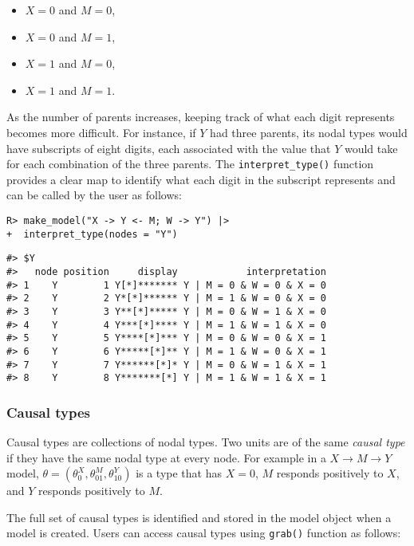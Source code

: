 \documentclass[
  11pt,
  article]{jss}
\providecommand{\tightlist}{%
  \setlength{\itemsep}{0pt}\setlength{\parskip}{0pt}}\usepackage{longtable,booktabs,array}
\begin{document}
\begin{itemize}
\tightlist
\item
  \(X = 0\) and \(M = 0\),
\item
  \(X = 0\) and \(M = 1\),
\item
  \(X = 1\) and \(M = 0\),
\item
  \(X = 1\) and \(M = 1\).
\end{itemize}

As the number of parents increases, keeping track of what each digit
represents becomes more difficult. For instance, if \(Y\) had three
parents, its nodal types would have subscripts of eight digits, each
associated with the value that \(Y\) would take for each combination of
the three parents. The \texttt{interpret\_type()} function provides a
clear map to identify what each digit in the subscript represents and
can be called by the user as follows:

\begin{verbatim}
R> make_model("X -> Y <- M; W -> Y") |> 
+  interpret_type(nodes = "Y")
\end{verbatim}

\begin{verbatim}
#> $Y
#>   node position     display            interpretation
#> 1    Y        1 Y[*]******* Y | M = 0 & W = 0 & X = 0
#> 2    Y        2 Y*[*]****** Y | M = 1 & W = 0 & X = 0
#> 3    Y        3 Y**[*]***** Y | M = 0 & W = 1 & X = 0
#> 4    Y        4 Y***[*]**** Y | M = 1 & W = 1 & X = 0
#> 5    Y        5 Y****[*]*** Y | M = 0 & W = 0 & X = 1
#> 6    Y        6 Y*****[*]** Y | M = 1 & W = 0 & X = 1
#> 7    Y        7 Y******[*]* Y | M = 0 & W = 1 & X = 1
#> 8    Y        8 Y*******[*] Y | M = 1 & W = 1 & X = 1
\end{verbatim}

\subsubsection{Causal types}\label{sec-causal-types}

Causal types are collections of nodal types. Two units are of the same
\emph{causal type} if they have the same nodal type at every node. For
example in a \(X \rightarrow M \rightarrow Y\) model,
\(\theta = (\theta^X_0, \theta^M_{01}, \theta^Y_{10})\) is a type that
has \(X=0\), \(M\) responds positively to \(X\), and \(Y\) responds
positively to \(M\).

The full set of causal types is identified and stored in the model
object when a model is created. Users can access causal types using
\texttt{grab()} function as follows:
\end{document}
